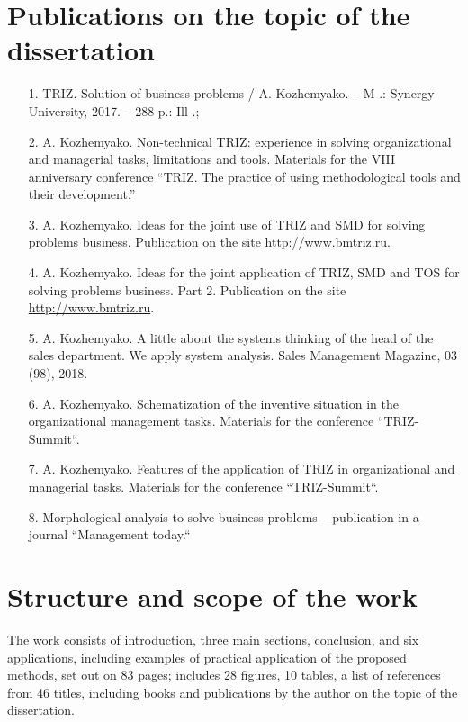 \section{Publications on the topic of the dissertation}
\begin{itemize}
\item[1.] TRIZ. Solution of business problems / A. Kozhemyako. -- M .: Synergy
  University, 2017. -- 288 p.: Ill .;
\item[2.] A. Kozhemyako. Non-technical TRIZ: experience in solving
  organizational and managerial tasks, limitations and tools. Materials for
  the VIII anniversary conference “TRIZ. The practice of using methodological
  tools and their development.”
\item[3.] A. Kozhemyako. Ideas for the joint use of TRIZ and SMD for solving
  problems business. Publication on the site \url{http://www.bmtriz.ru}.
\item[4.] A. Kozhemyako. Ideas for the joint application of TRIZ, SMD and TOS
  for solving problems business. Part 2. Publication on the site
  \url{http://www.bmtriz.ru}.
\item[5.] A. Kozhemyako. A little about the systems thinking of the head of
  the sales department.  We apply system analysis. Sales Management Magazine,
  03 (98), 2018.
\item[6.] A. Kozhemyako. Schematization of the inventive situation in the
  organizational management tasks. Materials for the conference “TRIZ-Summit“.
\item[7.] A. Kozhemyako. Features of the application of TRIZ in organizational
  and managerial tasks. Materials for the conference “TRIZ-Summit“.
\item[8.] Morphological analysis to solve business problems -- publication in
  a journal “Management today.“
\end{itemize}
\section{Structure and scope of the work}
The work consists of introduction, three main sections, conclusion, and six
applications, including examples of practical application of the proposed
methods, set out on 83 pages; includes 28 figures, 10 tables, a list of
references from 46 titles, including books and publications by the author on
the topic of the dissertation.

